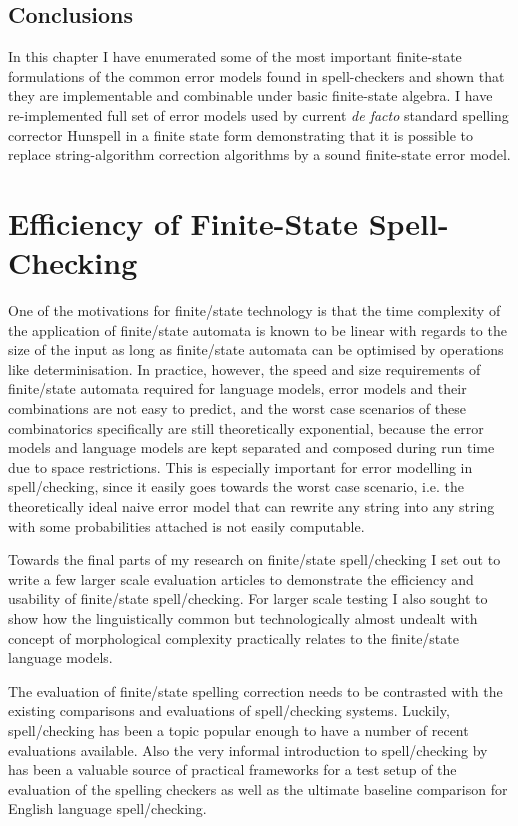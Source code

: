 \documentclass[officiallayout]{unihelcompling}
\begin{document}
\section{Conclusions}

In this chapter I have enumerated some of the most important finite-state
formulations of the common error models found in spell-checkers and shown that
they are implementable and combinable under basic finite-state algebra. I have
re-implemented full set of error models used by current \emph{de facto}
standard spelling corrector Hunspell in a finite state form demonstrating that
it is possible to replace string-algorithm correction algorithms by a sound
finite-state error model.

\chapter{Efficiency of Finite-State Spell-Checking}
\label{chap:efficiency}

One of the motivations for finite\-/state technology is that the time
complexity of the application of finite\-/state automata is known to be linear
with regards to the size of the input as long as finite\-/state automata can be
optimised by operations like determinisation. In practice, however, the speed
and size requirements of finite\-/state automata required for language models,
error models and their combinations are not easy to predict, and the worst case
scenarios of these combinatorics specifically are still theoretically
exponential, because the error models and language models are kept separated
and composed during run time due to space restrictions. This is especially
important for error modelling in spell\-/checking, since it easily goes towards
the worst case scenario, i.e. the theoretically ideal naive error model that
can rewrite any string into any string with some probabilities attached is not
easily computable.

Towards the final parts of my research on finite\-/state spell\-/checking I
set out to write a few larger scale evaluation articles to demonstrate the
efficiency and usability of finite\-/state spell\-/checking. For larger scale
testing I also sought to show how the linguistically common but technologically
almost undealt with concept of morphological complexity practically relates to
the finite\-/state language models.

The evaluation of finite\-/state spelling correction needs to be contrasted
with the existing comparisons and evaluations of spell\-/checking systems.
Luckily, spell\-/checking has been a topic popular enough to have a number
of recent evaluations available.  Also the very informal introduction to
spell\-/checking by~\citet{norvig2010howto} has been a valuable source of
practical frameworks for a test setup of the evaluation of the spelling
checkers as well as the ultimate baseline comparison for English language
spell\-/checking.
\end{document}
